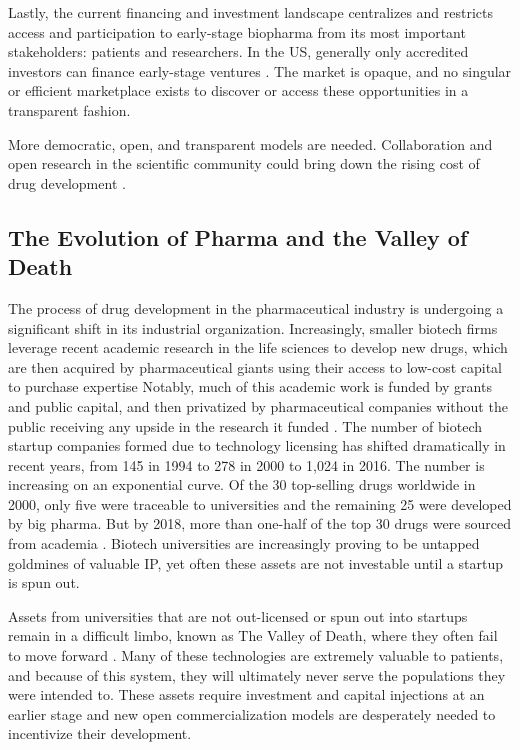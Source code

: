 \documentclass[12pt,letterpaper]{article}
\begin{document}
Lastly, the current financing and investment landscape centralizes and restricts access and participation to early-stage biopharma from its most important stakeholders: patients and researchers. In the US, generally only accredited investors can finance early-stage ventures \citep{Rowley2018}. The market is opaque, and no singular or efficient marketplace exists to discover or access these opportunities in a transparent fashion.

More democratic, open, and transparent models are needed. Collaboration and open research in the scientific community could bring down the rising cost of drug development \citep{Bookbinder2020}.

\subsection{The Evolution of Pharma and the Valley of Death}
The process of drug development in the pharmaceutical industry is undergoing a significant shift in its industrial organization. Increasingly, smaller biotech firms leverage recent academic research in the life sciences to develop new drugs, which are then acquired by pharmaceutical giants using their access to low-cost capital to purchase expertise \citep{Huang2021} Notably, much of this academic work is funded by grants and public capital, and then privatized by pharmaceutical companies without the public receiving any upside in the research it funded \citep{Toole2004}. The number of biotech startup companies formed due to technology licensing has shifted dramatically in recent years, from 145 in 1994 to 278 in 2000 to 1,024 in 2016. The number is increasing on an exponential curve. Of the 30 top-selling drugs worldwide in 2000, only five were traceable to universities and the remaining 25 were developed by big pharma. But by 2018, more than one-half of the top 30 drugs were sourced from academia \citep{Huang2021}. Biotech universities are increasingly proving to be untapped goldmines of valuable IP, yet often these assets are not investable until a startup is spun out. 

Assets from universities that are not out-licensed or spun out into startups remain in a difficult limbo, known as The Valley of Death, where they often fail to move forward \citep{Seyhan2019}. Many of these technologies are extremely valuable to patients, and because of this system, they will ultimately never serve the populations they were intended to. These assets require investment and capital injections at an earlier stage and new open commercialization models are desperately needed to incentivize their development.
\end{document}
